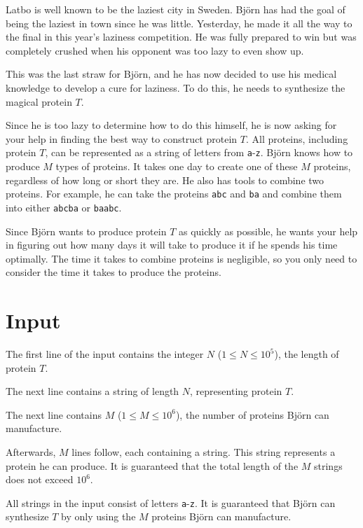 
\noindent
Latbo is well known to be the laziest city in Sweden. Björn has had the goal of being the
laziest in town since he was little. Yesterday, he made it all the way to the final in
this year's laziness competition. He was fully prepared to win but was completely crushed
when his opponent was too lazy to even show up.

This was the last straw for Björn, and he has now decided to use his medical knowledge to
develop a cure for laziness. To do this, he needs to synthesize the magical protein $T$.

Since he is too lazy to determine how to do this himself, he is now asking for your help in
finding the best way to construct protein $T$. All proteins, including protein $T$, can be
represented as a string of letters from \texttt{a}-\texttt{z}. Björn knows how to produce
$M$ types of proteins. It takes one day to create one of these $M$ proteins, regardless of how
long or short they are. He also has tools to combine two proteins. For example, he can take the
proteins \texttt{abc} and \texttt{ba} and combine them into either \texttt{abcba} or \texttt{baabc}.

Since Björn wants to produce protein $T$ as quickly as possible, he wants your help in figuring
out how many days it will take to produce it if he spends his time optimally. The time it takes to
combine proteins is negligible, so you only need to consider the time it takes to produce the proteins.


\section*{Input}
The first line of the input contains the integer $N$ ($1 \le N \le 10^5$), the length of protein $T$.

The next line contains a string of length $N$, representing protein $T$.

The next line contains $M$ ($1 \le M \le 10^6$), the number of proteins Björn can manufacture.

Afterwards, $M$ lines follow, each containing a string. This string represents a protein he can produce.
It is guaranteed that the total length of the $M$ strings does not exceed $10^6$.

All strings in the input consist of letters \texttt{a}-\texttt{z}. It is guaranteed that Björn can
synthesize $T$ by only using the $M$ proteins Björn can manufacture.

